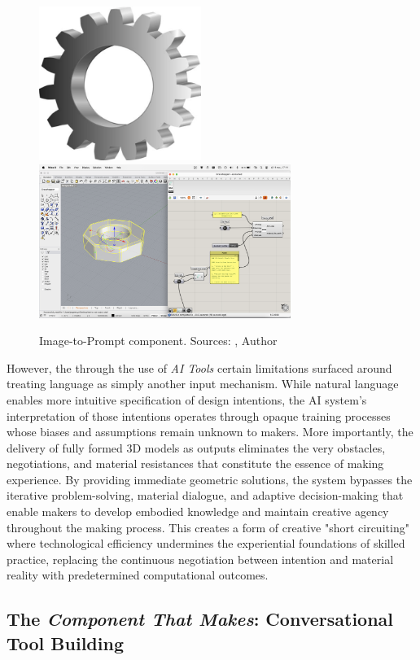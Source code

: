 \begin{figure}[H]
\centering
\includegraphics[height=5cm]{figures/chapter3/image-to-prompt-1.png}
\hspace{1cm}
\includegraphics[height=5cm]{figures/chapter3/image-to-prompt-2.png}
\caption{Image-to-Prompt component. Sources: \citet{yopriceville_gear}, Author}
\label{fig:image-to-prompt}
\end{figure}

However, the through the use of \textit{AI Tools} certain limitations surfaced around treating language as simply another input mechanism. While natural language enables more intuitive specification of design intentions, the AI system's interpretation of those intentions operates through opaque training processes whose biases and assumptions remain unknown to makers. More importantly, the delivery of fully formed 3D models as outputs eliminates the very obstacles, negotiations, and material resistances that constitute the essence of making experience. By providing immediate geometric solutions, the system bypasses the iterative problem-solving, material dialogue, and adaptive decision-making that enable makers to develop embodied knowledge and maintain creative agency throughout the making process. This creates a form of creative "short circuiting" where technological efficiency undermines the experiential foundations of skilled practice, replacing the continuous negotiation between intention and material reality with predetermined computational outcomes.

\subsection{The \textit{Component That Makes}: Conversational Tool Building}

